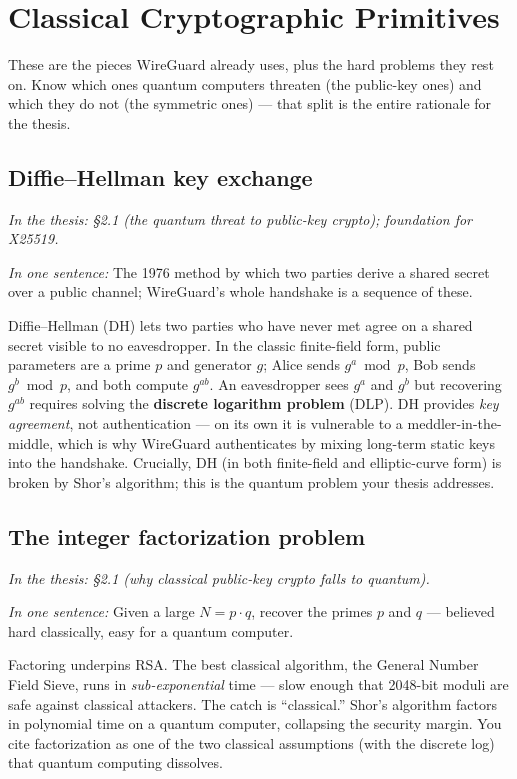 \documentclass[11pt]{article}
\newcommand{\seethesis}[1]{%
  {\small\color{softgray}\textit{In the thesis: #1}}\par\vspace{3pt}}
\newcommand{\nutshell}[1]{\noindent\textit{In one sentence:} #1\par\vspace{4pt}}
\begin{document}
\section{Classical Cryptographic Primitives}
These are the pieces WireGuard already uses, plus the hard problems they rest on.
Know which ones quantum computers threaten (the public-key ones) and which they
do not (the symmetric ones) --- that split is the entire rationale for the thesis.

\subsection{Diffie--Hellman key exchange}
\seethesis{\S2.1 (the quantum threat to public-key crypto); foundation for X25519.}
\nutshell{The 1976 method by which two parties derive a shared secret over a
public channel; WireGuard's whole handshake is a sequence of these.}

Diffie--Hellman (DH) lets two parties who have never met agree on a shared secret
visible to no eavesdropper. In the classic finite-field form, public parameters
are a prime $p$ and generator $g$; Alice sends $g^a \bmod p$, Bob sends
$g^b \bmod p$, and both compute $g^{ab}$. An eavesdropper sees $g^a$ and $g^b$
but recovering $g^{ab}$ requires solving the \textbf{discrete logarithm problem}
(DLP). DH provides \emph{key agreement}, not authentication --- on its own it is
vulnerable to a meddler-in-the-middle, which is why WireGuard authenticates by
mixing long-term static keys into the handshake. Crucially, DH (in both
finite-field and elliptic-curve form) is broken by Shor's algorithm; this is the
quantum problem your thesis addresses.

\subsection{The integer factorization problem}
\seethesis{\S2.1 (why classical public-key crypto falls to quantum).}
\nutshell{Given a large $N = p\cdot q$, recover the primes $p$ and $q$ ---
believed hard classically, easy for a quantum computer.}

Factoring underpins RSA. The best classical algorithm, the General Number Field
Sieve, runs in \emph{sub-exponential} time --- slow enough that 2048-bit moduli
are safe against classical attackers. The catch is ``classical.'' Shor's
algorithm factors in polynomial time on a quantum computer, collapsing the
security margin. You cite factorization as one of the two classical assumptions
(with the discrete log) that quantum computing dissolves.
\end{document}
